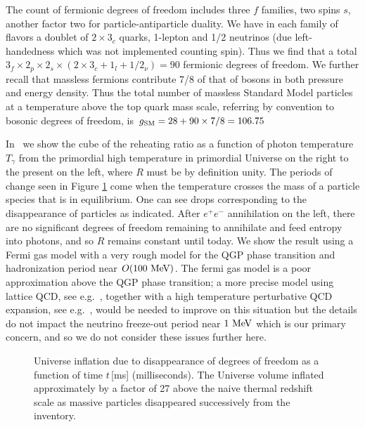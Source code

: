 The count of fermionic degrees of freedom includes three $f$ families, two spins $s$, another factor two for particle-antiparticle duality. We have in each family of flavors a doublet of $2\times 3_c$ quarks, 1-lepton and 1/2 neutrinos (due left-handedness which was not implemented counting spin). Thus we find that a total $3_f\times 2_p\times 2_s\times(2\times 3_c+1_l+1/2_\nu)=90$ fermionic degrees of freedom. We further recall that massless fermions contribute 7/8 of that of bosons in both pressure and energy density. Thus the total number of massless Standard Model particles at a temperature above the top quark mass scale, referring by convention to bosonic degrees of freedom, is $g_{\rm SM}=28+90\times 7/8=106.75$ 



In~ we show the cube of the reheating ratio  as a function of photon temperature $T_\gamma$ from the primordial high temperature in primordial Universe on the right to the present on the left, where $R$ must be by definition unity. The periods of change seen in Figure \ref{fig:dof} come when the temperature crosses the mass of a particle species that is in equilibrium. One can see drops corresponding to the disappearance of particles as indicated. After $e^+e^-$ annihilation on the left, there are no significant degrees of freedom remaining to annihilate and feed entropy into photons, and so $R$ remains constant until today. We show the result using a Fermi gas model with a very rough model for the QGP phase transition and hadronization period near $O(100\text{ MeV})$. The fermi gas model is a poor approximation above the QGP phase transition; a more precise model using lattice QCD, see e.g.~\cite{Borsanyi:2013bia}, together with a high temperature perturbative QCD expansion, see e.g.~\cite{Letessier:2002ony}, would be needed to improve on this situation but the details do not impact the neutrino freeze-out period near $1\text{ MeV}$ which is our primary concern, and so we do not consider these issues further here.

\begin{figure}
\caption{Universe inflation due to disappearance of degrees of freedom as a function of time $t$\,[ms] (milliseconds). The Universe volume inflated approximately by a factor of 27 above the naive thermal  redshift scale as massive particles disappeared successively from the inventory. \label{fig:dof}}
 \end{figure}


